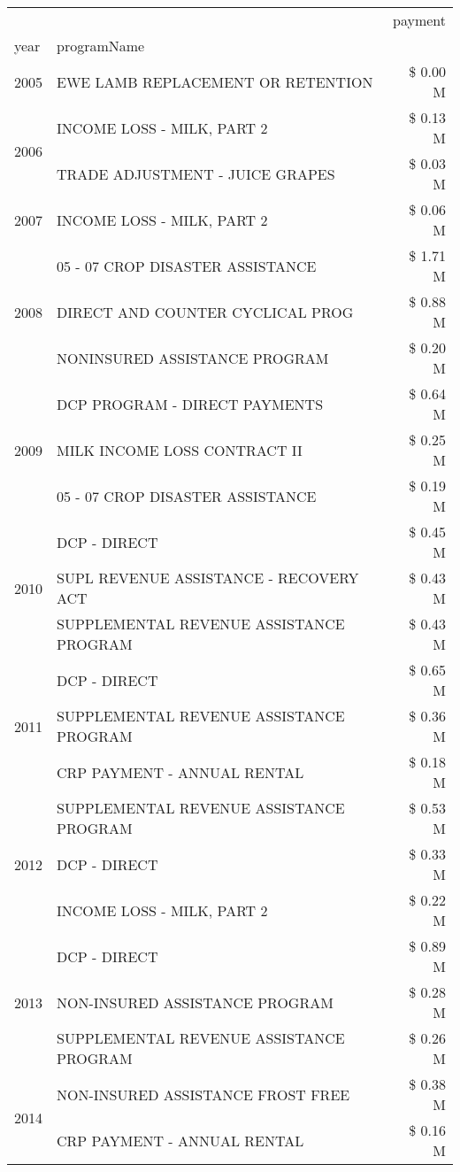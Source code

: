 \begin{tabular}{llr}
\toprule
 &  & payment \\
year & programName &  \\
\midrule
2005 & EWE LAMB REPLACEMENT OR RETENTION & \$ 0.00 M \\
\cline{1-3}
\multirow[t]{2}{*}{2006} & INCOME LOSS - MILK, PART 2 & \$ 0.13 M \\
 & TRADE ADJUSTMENT - JUICE GRAPES & \$ 0.03 M \\
\cline{1-3}
2007 & INCOME LOSS - MILK, PART 2 & \$ 0.06 M \\
\cline{1-3}
\multirow[t]{3}{*}{2008} & 05 - 07 CROP DISASTER ASSISTANCE & \$ 1.71 M \\
 & DIRECT AND COUNTER CYCLICAL PROG & \$ 0.88 M \\
 & NONINSURED ASSISTANCE PROGRAM & \$ 0.20 M \\
\cline{1-3}
\multirow[t]{3}{*}{2009} & DCP PROGRAM - DIRECT PAYMENTS & \$ 0.64 M \\
 & MILK INCOME LOSS CONTRACT II & \$ 0.25 M \\
 & 05 - 07 CROP DISASTER ASSISTANCE & \$ 0.19 M \\
\cline{1-3}
\multirow[t]{3}{*}{2010} & DCP - DIRECT & \$ 0.45 M \\
 & SUPL REVENUE ASSISTANCE - RECOVERY ACT & \$ 0.43 M \\
 & SUPPLEMENTAL REVENUE ASSISTANCE PROGRAM & \$ 0.43 M \\
\cline{1-3}
\multirow[t]{3}{*}{2011} & DCP - DIRECT & \$ 0.65 M \\
 & SUPPLEMENTAL REVENUE ASSISTANCE PROGRAM & \$ 0.36 M \\
 & CRP PAYMENT - ANNUAL RENTAL & \$ 0.18 M \\
\cline{1-3}
\multirow[t]{3}{*}{2012} & SUPPLEMENTAL REVENUE ASSISTANCE PROGRAM & \$ 0.53 M \\
 & DCP - DIRECT & \$ 0.33 M \\
 & INCOME LOSS - MILK, PART 2 & \$ 0.22 M \\
\cline{1-3}
\multirow[t]{3}{*}{2013} & DCP - DIRECT & \$ 0.89 M \\
 & NON-INSURED ASSISTANCE PROGRAM & \$ 0.28 M \\
 & SUPPLEMENTAL REVENUE ASSISTANCE PROGRAM & \$ 0.26 M \\
\cline{1-3}
\multirow[t]{3}{*}{2014} & NON-INSURED ASSISTANCE FROST FREE & \$ 0.38 M \\
 & CRP PAYMENT - ANNUAL RENTAL & \$ 0.16 M \\

\end{tabular}
